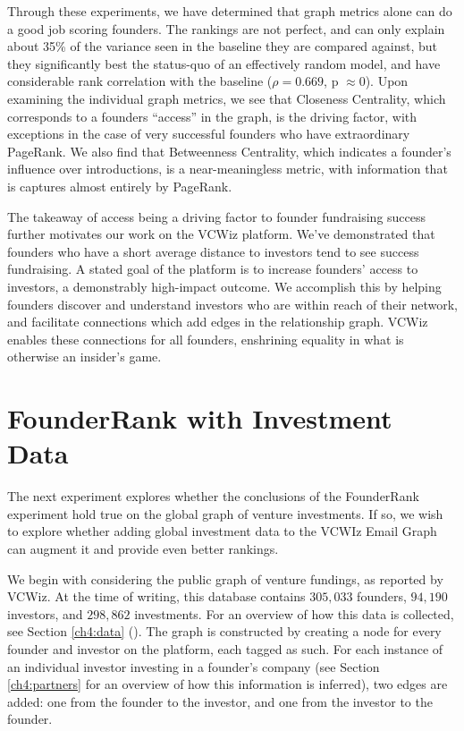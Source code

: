 Through these experiments, we have determined that graph metrics alone can do a good job scoring founders. The rankings are not perfect, and can only explain about 35\% of the variance seen in the baseline they are compared against, but they significantly best the status-quo of an effectively random model, and have considerable rank correlation with the baseline ($\rho = 0.669$, p $\approx 0$). Upon examining the individual graph metrics, we see that Closeness Centrality, which corresponds to a founders ``access'' in the graph, is the driving factor, with exceptions in the case of very successful founders who have extraordinary PageRank. We also find that Betweenness Centrality, which indicates a founder's influence over introductions, is a near-meaningless metric, with information that is captures almost entirely by PageRank.

The takeaway of access being a driving factor to founder fundraising success further motivates our work on the VCWiz platform. We've demonstrated that founders who have a short average distance to investors tend to see success fundraising. A stated goal of the platform is to increase founders' access to investors, a demonstrably high-impact outcome. We accomplish this by helping founders discover and understand investors who are within reach of their network, and facilitate connections which add edges in the relationship graph. VCWiz enables these connections for all founders, enshrining equality in what is otherwise an insider's game.

\section{FounderRank with Investment Data}

The next experiment explores whether the conclusions of the FounderRank experiment hold true on the global graph of venture investments. If so, we wish to explore whether adding global investment data to the VCWIz Email Graph can augment it and provide even better rankings.

We begin with considering the public graph of venture fundings, as reported by VCWiz. At the time of writing, this database contains $305,033$ founders, $94,190$ investors, and $298,862$ investments. For an overview of how this data is collected, see Section \ref{ch4:data} (\pageref{ch4:data}). The graph is constructed by creating a node for every founder and investor on the platform, each tagged as such. For each instance of an individual investor investing in a founder's company (see Section \ref{ch4:partners} for an overview of how this information is inferred), two edges are added: one from the founder to the investor, and one from the investor to the founder.

